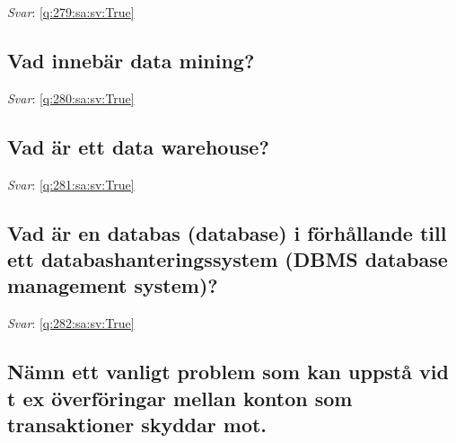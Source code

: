 \documentclass[a4paper,11pt,oneside]{article}
\begin{document}
\begin{sloppypar}
\vspace{1cm}

\textit{Svar}: \autoref{q:279:sa:sv:True}



\subsection{Vad inneb\"ar data mining?}

\label{q:280:sa:sv:False}

\vspace{2cm}

\noindent\makebox[\textwidth]{\hrulefill}

\vspace{1cm}

\textit{Svar}: \autoref{q:280:sa:sv:True}



\subsection{Vad \"ar ett data warehouse?}

\label{q:281:sa:sv:False}

\vspace{2cm}

\noindent\makebox[\textwidth]{\hrulefill}

\vspace{1cm}

\textit{Svar}: \autoref{q:281:sa:sv:True}



\subsection{Vad \"ar en databas (database) i f\"orh\r{a}llande till ett databashanteringssystem (DBMS {\textendash} database management system)?}

\label{q:282:sa:sv:False}

\vspace{2cm}

\noindent\makebox[\textwidth]{\hrulefill}

\vspace{1cm}

\textit{Svar}: \autoref{q:282:sa:sv:True}



\subsection{N\"amn ett vanligt problem som kan uppst\r{a} vid t ex \"overf\"oringar mellan konton som transaktioner skyddar mot.}


\end{sloppypar}
\end{document}
